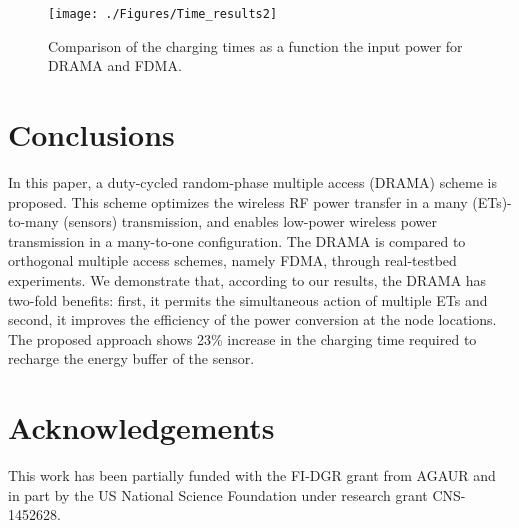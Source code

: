 \documentclass[conference]{IEEEtran}
\begin{document}
\begin{figure}
  \centering
    \texttt{[image: ./Figures/Time\_results2]}
 \caption{Comparison of the charging times as a function the input power for DRAMA and FDMA.}
 \label{fig:time_results}
 \vspace{0.0 cm}
\end{figure}

\section{Conclusions}
\label{sec:Conclusions}
In this paper, a duty-cycled random-phase multiple access (DRAMA) scheme is proposed. This scheme optimizes the wireless RF power transfer in a many (ETs)-to-many (sensors) transmission, and enables low-power wireless power transmission in a many-to-one configuration. 
The DRAMA is compared to orthogonal multiple access schemes, namely FDMA, through real-testbed experiments.  
We demonstrate that, according to our results, the DRAMA has two-fold benefits: first, it permits the simultaneous action of multiple ETs and second, it improves the efficiency of the power conversion at the node locations. The proposed approach shows 23\% increase in the charging time required to recharge the energy buffer of the sensor.

\section*{Acknowledgements}
This work has been partially funded with the FI-DGR grant from AGAUR and in part by the US National Science Foundation under research grant CNS-1452628.

\balance


\end{document}
